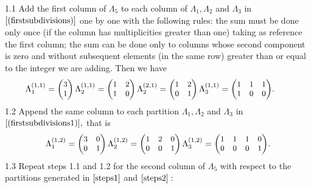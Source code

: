 \hskip-0.5cm 1.1 Add the first column of \(\Lambda_5\) to each column of
\(\Lambda_1, \Lambda_2\) and \(\Lambda_3\) in
\(\eqref{(firstsubdivisions)}\) one by one with the following rules: the
sum must be done only once (if the column has multiplicities greater
than one) taking as reference the first column; the sum can be done only
to columns whose second component is zero and without subsequent
elements (in the same row) greater than or equal to the integer we are
adding. Then we have \begin{equation}
\!\!\!\!\!\!\!\!\!\!\!{\small \Lambda^{(1,1)}_1= \begin{pmatrix}
3 \\
1
\end{pmatrix} \Lambda^{(1,1)}_2 = \begin{pmatrix}
1 & 2 \\
1 & 0
\end{pmatrix} \Lambda^{(2,1)}_2 = \begin{pmatrix}
1 & 2 \\
0 & 1
\end{pmatrix}  \Lambda^{(1,1)}_3=\begin{pmatrix}
1 & 1 & 1 \\
1 & 0 & 0
\end{pmatrix}}. 
\label{steps1}
\end{equation} 1.2 Append the same column to each partition
\(\Lambda_1, \Lambda_2\) and \(\Lambda_3\) in
\(\eqref{(firstsubdivisions1)},\) that is\\
\begin{equation}
{\small \Lambda^{(1,2)}_1= \begin{pmatrix}
3 & 0 \\
0 & 1
\end{pmatrix}  \Lambda^{(1,2)}_2= \begin{pmatrix}
1 & 2 & 0\\
0 & 0 & 1
\end{pmatrix}  \Lambda^{(1,2)}_3=\begin{pmatrix}
1 & 1 & 1 & 0\\
0 & 0 & 0 & 1
\end{pmatrix}}.
\label{steps2}
\end{equation} 1.3 Repeat steps 1.1 and 1.2 for the second column of
\(\Lambda_5\) with respect to the partitions generated in
\(\eqref{steps1}\) and \(\eqref{steps2}:\)\\
